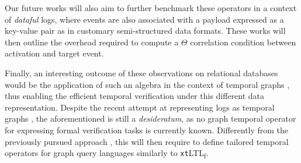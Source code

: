 \documentclass[sigconf]{acmart}
\begin{document}
Our future works will also aim to further benchmark these operators in a context of \textit{dataful} logs, where events are also associated with a payload expressed as a key-value pair as in customary semi-structured data formats. These works will then outline the overhead required to compute a $\Theta$ correlation condition between activation and target event. 

Finally, an interesting outcome of these observations on relational databases would be the application of such an algebra in the context of temporal graphs 
\cite{DBLP:journals/vldb/RostGTFSCAJR22}, thus enabling the efficient temporal verification under this different data representation. Despite the recent attempt at representing logs as temporal graphs \cite{olaf}, the aforementioned is still a \textit{desideratum}, as no graph temporal operator for expressing formal verification tasks is currently known. Differently from the previously pursued approach \cite{DBLP:conf/medi/ZakiHH022}, this will then require to define tailored temporal operators for graph query languages similarly to \texttt{xt}LTL\textsubscript{f}.




%
%
%
\end{document}
